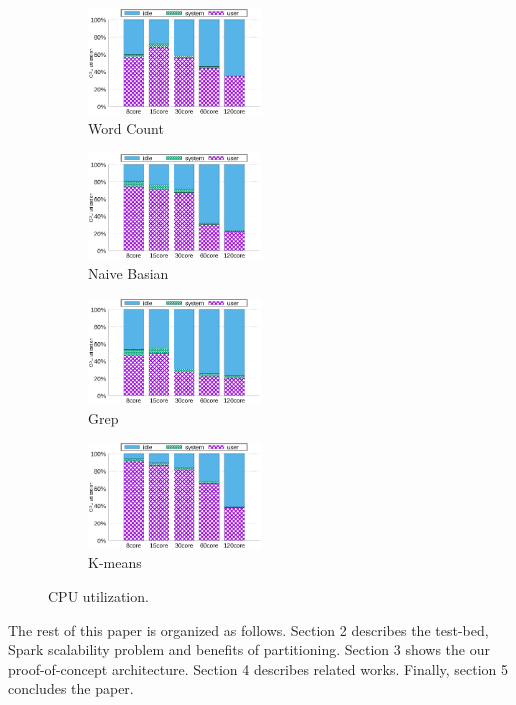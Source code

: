 \begin{figure}[tb]
    \centering
    \begin{subfigure}[b]{0.25\textwidth}
        \includegraphics[width=1.8in]{graph/wc_cpuutils.eps}
        \caption{Word Count}
    \end{subfigure}%
    \begin{subfigure}[b]{0.25\textwidth}
        \includegraphics[width=1.8in]{graph/nb_cpuutils.eps}
        \caption{Naive Basian}
    \end{subfigure}%
    \begin{subfigure}[b]{0.25\textwidth}
        \includegraphics[width=1.8in]{graph/grep_cpuutils.eps}
        \caption{Grep}
    \end{subfigure}%
    \begin{subfigure}[b]{0.25\textwidth}
        \includegraphics[width=1.8in]{graph/kmeans_cpuutils.eps}
        \caption{K-means}
    \end{subfigure}%
        \centering
    \caption{CPU utilization.}
    \label{fig:cpuutilization}
\end{figure}

The rest of this paper is organized as follows.
Section 2 describes the test-bed, Spark scalability problem and benefits of partitioning.
Section 3 shows the our proof-of-concept architecture.
Section 4 describes related works. 
Finally, section 5 concludes the paper.

